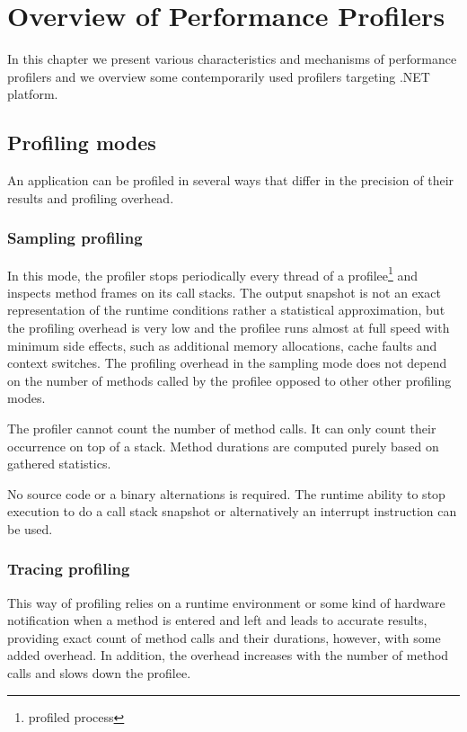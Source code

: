 \chapter{Overview of Performance Profilers }

In this chapter we present various characteristics and mechanisms of performance profilers and we overview some contemporarily used profilers targeting .NET platform.

\label{01ProfModes}
\section{Profiling modes}
An application can be profiled in several ways that differ in the precision of their results and profiling overhead. 

\subsection{Sampling profiling}
In this mode, the profiler stops periodically every thread of a profilee\footnote{profiled process} and inspects method frames on its call stacks. The output snapshot is not an exact representation of the runtime conditions rather a statistical approximation, but the profiling overhead is very low and the profilee runs almost at full speed with minimum side effects, such as additional memory allocations, cache faults and context switches. The profiling overhead in the sampling mode does not depend on the number of methods called by the profilee opposed to other other profiling modes. 

The profiler cannot count the number of method calls. It can only count their occurrence on top of a stack. Method durations are computed purely based on gathered statistics. 

No source code or a binary alternations is required. The runtime ability to stop execution to do a call stack snapshot or alternatively an interrupt instruction can be used.

\subsection{Tracing profiling}
This way of profiling relies on a runtime environment or some kind of hardware notification when a method is entered and left and leads to accurate results, providing exact count of method calls and their durations, however, with some added overhead. In addition, the overhead increases with the number of method calls and slows down the profilee.

